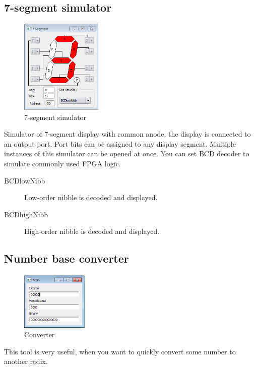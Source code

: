 \subsection{7-segment simulator}
    \begin{figure}
        \centering{}
        \includegraphics[width=110pt]{img/7seg_sim.png}
        \caption{7-segment simulator}
    \end{figure}
    Simulator of 7-segment display with common anode, the display is connected to an output port. Port bits can be
    assigned to any display segment. Multiple instances of this simulator can be opened at once. You can set BCD decoder
    to simulate commonly used FPGA logic.

    \begin{description}
        \item[BCDlowNibb] Low-order nibble is decoded and displayed.
        \item[BCDhighNibb] High-order nibble is decoded and displayed.
    \end{description}

\subsection{Number base converter}
    \begin{figure}
            \centering
            \includegraphics[width=90pt]{img/convertor.png}
            \caption{Converter}
    \end{figure}

    This tool is very useful, when you want to quickly convert some number to another radix.
